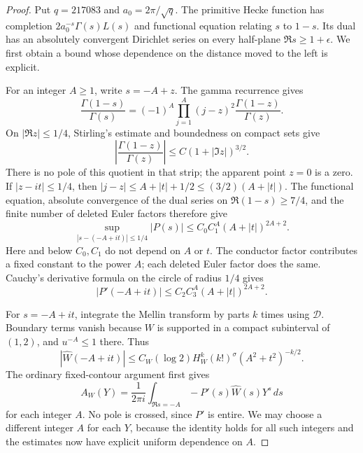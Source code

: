 \documentclass[11pt]{article}
\begin{document}
\begin{proof}
Put $q=217083$ and $a_0=2\pi/\sqrt q$. The primitive Hecke function has
completion $2a_0^{-s}\Gamma(s)L(s)$ and functional equation relating
$s$ to $1-s$. Its dual has an absolutely convergent Dirichlet series
on every half-plane $\Re s\ge1+\epsilon$. We first obtain a bound whose
dependence on the distance moved to the left is explicit.

For an integer $A\ge1$, write $s=-A+z$. The gamma recurrence gives
\[
 \frac{\Gamma(1-s)}{\Gamma(s)}
 =(-1)^A\prod_{j=1}^A(j-z)^2
          \frac{\Gamma(1-z)}{\Gamma(z)}.
\]
On $|\Re z|\le1/4$, Stirling's estimate and boundedness on compact
sets give
\[
 \left|\frac{\Gamma(1-z)}{\Gamma(z)}\right|
 \le C(1+|\Im z|)^{3/2}.
\]
There is no pole of this quotient in that strip; the apparent point
$z=0$ is a zero. If $|z-it|\le1/4$, then
$|j-z|\le A+|t|+1/2\le(3/2)(A+|t|)$.
The functional equation, absolute convergence of the dual series
on $\Re(1-s)\ge7/4$, and the finite number of deleted Euler factors
therefore give
\[
 \sup_{|s-(-A+it)|\le1/4}|P(s)|
 \le C_0 C_1^A(A+|t|)^{2A+2}.
\]
Here and below $C_0,C_1$ do not depend on $A$ or $t$. The conductor
factor contributes a fixed constant to the power $A$; each deleted
Euler factor does the same. Cauchy's derivative formula on the circle
of radius $1/4$ gives
\begin{equation}\label{eq:gevrey-left-growth}
 |P'(-A+it)|\le C_2 C_3^A(A+|t|)^{2A+2}.
\end{equation}

For $s=-A+it$, integrate the Mellin transform by parts $k$ times
using $\mathcal D$. Boundary terms vanish because $W$ is supported
in a compact subinterval of $(1,2)$, and $u^{-A}\le1$ there. Thus
\begin{equation}\label{eq:gevrey-mellin}
 |\widehat W(-A+it)|
 \le C_W(\log2)H_W^k(k!)^\sigma(A^2+t^2)^{-k/2}.
\end{equation}
The ordinary fixed-contour argument first gives
\[
 A_W(Y)=\frac1{2\pi i}\int_{\Re s=-A}
                   -P'(s)\widehat W(s)Y^s\,ds
\]
for each integer $A$. No pole is crossed, since $P'$ is entire.
We may choose a different integer $A$ for each $Y$, because the
identity holds for all such integers and the estimates now have
explicit uniform dependence on $A$.


\end{proof}
\end{document}
